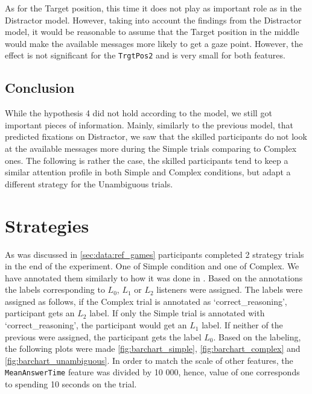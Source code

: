 As for the Target position, this time it does not play as important role as in the Distractor model. However, taking into account the findings from the Distractor model, it would be reasonable to assume that the Target position in the middle would make the available messages more likely to get a gaze point. However, the effect is not significant for the \texttt{TrgtPos2} and is very small for both features. 

\subsection*{Conclusion}
\label{sec:avmsgs_conclusion}
While the hypothesis 4 did not hold according to the model, we still got important pieces of information. Mainly, similarly to the previous model, that predicted fixations on Distractor, we saw that the skilled participants do not look at the available messages more during the Simple trials comparing to Complex ones. The following is rather the case, the skilled participants tend to keep a similar attention profile in both Simple and Complex conditions, but adapt a different strategy for the Unambiguous trials. 









\section{Strategies}

As was discussed in \autoref{sec:data:ref_games} participants completed 2 strategy trials in the end of the experiment. One of Simple condition and one of Complex. We have annotated them similarly to how it was done in \cite{Mayn_2023}. Based on the annotations the labels corresponding to $L_0$, $L_1$ or $L_2$ listeners were assigned. The labels were assigned as follows, if the Complex trial is annotated as `correct\_reasoning', participant gets an $L_2$ label. If only the Simple trial is annotated with `correct\_reasoning', the participant would get an $L_1$ label. If neither of the previous were assigned, the participant gets the label $L_0$. Based on the labeling, the following plots were made \autoref{fig:barchart_simple}, \autoref{fig:barchart_complex} and \autoref{fig:barchart_unambiguous}. In order to match the scale of other features, the \texttt{MeanAnswerTime} feature was divided by 10 000, hence, value of one corresponds to spending 10 seconds on the trial.

